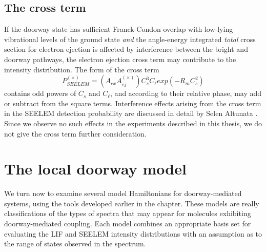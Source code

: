 \subsection{The cross term}

If the doorway state has sufficient Franck-Condon overlap with
low-lying vibrational levels of the ground state \emph{and} the
angle-energy integrated \emph{total} cross section for electron
ejection is affected by interference between the bright and doorway
pathways, the electron ejection cross term may contribute to the
intensity distribution. The form of the cross term
\begin{equation}
  P_{SEELEM}^{(\times)} = \left( A_{ex} A_{ej}^{(\times)} \right)
    C_s^3 C_\ell exp \left( -R_m C_s^2 \right)
\end{equation}
contains odd powers of $C_s$ and $C_{\ell}$, and according to their
relative phase, may add or subtract from the square terms.
Interference effects arising from the cross term in the SEELEM
detection probability are discussed in detail by Selen Altunata
\cite{altunata00, altunata02, altunata-thesis}.  Since we observe no
such effects in the experiments described in this thesis, we do not
give the cross term further consideration.



\section{The local doorway model}
\label{sec:model-local}

We turn now to examine several model Hamiltonians for doorway-mediated
systems, using the tools developed earlier in the chapter.  These
models are really classifications of the types of spectra that may
appear for molecules exhibiting doorway-mediated coupling.  Each model
combines an appropriate basis set for evaluating the LIF and SEELEM
intensity distributions with an assumption as to the range of states
observed in the spectrum.

